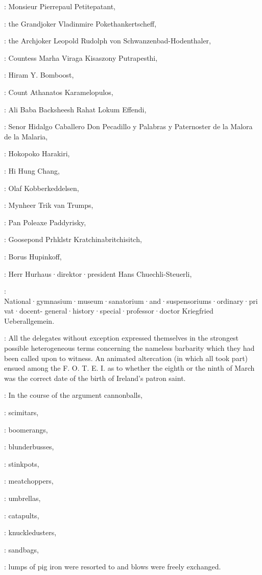 :
Monsieur Pierrepaul Petitepatant,

:
the Grandjoker Vladinmire Pokethankertscheff,

:
the Archjoker Leopold Rudolph von Schwanzenbad-Hodenthaler,

:
Countess Marha Viraga Kisaszony Putrapesthi,

:
Hiram Y. Bomboost,

:
Count Athanatos Karamelopulos,

:
Ali Baba Backsheesh Rahat Lokum Effendi, 

:
Senor Hidalgo Caballero Don Pecadillo y Palabras y Paternoster de la Malora de la Malaria, 

:
Hokopoko Harakiri, 

:
Hi Hung Chang, 

:
Olaf Kobberkeddelsen, 

:
Mynheer Trik van Trumps, 

:
Pan Poleaxe Paddyrisky, 

:
Goosepond Prhklstr Kratchinabritchisitch, 

:
Borus Hupinkoff, 

:
Herr Hurhaus·direktor·president Hans Chuechli-Steuerli, 

:
National·gymnasium·museum·sanatorium·and·suspensoriums·ordinary·privat·docent-
general·history·special·professor·doctor Kriegfried Ueberallgemein.

:
All the delegates without exception expressed themselves
in the strongest possible heterogeneous terms concerning the nameless
barbarity which they had been called upon to witness. An animated
altercation (in which all took part) ensued among the F. O. T. E. I.
as to whether the eighth or the ninth of March was the correct
date of the birth of Ireland's patron saint.

:
In the course of the argument cannonballs,

:
scimitars,

:
boomerangs, 

:
blunderbusses, 

:
stinkpots, 

:
meatchoppers, 

:
umbrellas, 

:
catapults, 

:
knuckledusters, 

:
sandbags, 

:
lumps of pig iron were resorted to and blows were freely exchanged.


